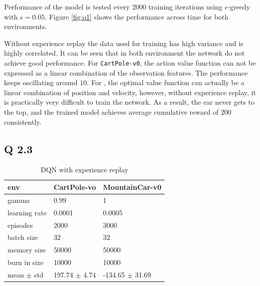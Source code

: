 \documentclass[12pt]{article}
\begin{document}
Performance of the model is tested every 2000 training iterations using $\epsilon$-greedy with $\epsilon=0.05$. Figure \ref{fig:q1} shows the performance across time for both environments. 

Without experience replay the data used for training has high variance and is highly correlated. It can be seen that in both environment the network do not achieve good performance. For \texttt{CartPole-v0}, the action value function can not be expressed as a linear combination of the observation features. The performance keeps oscillating around $10$. For , the optimal value function can actually be a linear combination of position and velocity, however, without experience replay, it is practically very difficult to train the network. As a result, the car never gets to the top, and the trained model achieves average cumulative reward of $200$ consistently. 

\subsection*{Q 2.3}
\begin{table}[h!]
\centering
\caption{DQN with experience replay}
\label{tab:dqn}
\begin{tabular}{|l|l|l|}
\hline
env           & CartPole-vo & MountainCar-v0 \\ \hline
gamma         & 0.99        &    1            \\ \hline
learning rate & 0.0001      &           0.0005     \\ \hline
episodes      & 2000        &       3000         \\ \hline
batch size      & 32        &       32         \\ \hline
memory size      & 50000        &       50000         \\ \hline
burn in size      & 10000        &       10000         \\ \hline
mean $\pm$ std  & 197.74 $\pm$ 4.74 &    -134.65 $\pm$ 31.69\\ \hline
\end{tabular}
\end{table}
\end{document}

